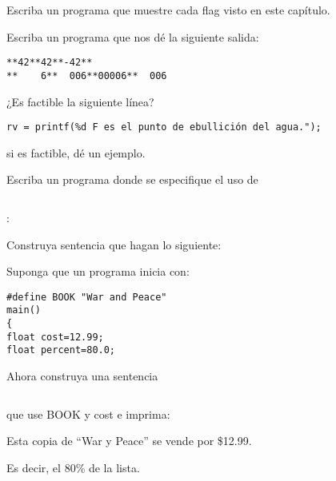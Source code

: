 \documentclass[spanish,addpoints,answers,a4paper]{exam}
\begin{document}
\begin{questions}

\question Escriba un programa que muestre cada flag visto en este capítulo.

\question Escriba un programa que nos dé la siguiente salida:

\begin{verbatim}
**42**42**-42**
**    6**  006**00006**  006
\end{verbatim}

\question ¿Es factible la siguiente línea?

\begin{verbatim}
rv = printf(%d F es el punto de ebullición del agua.");
\end{verbatim}

si es factible, dé un ejemplo.

\question Escriba un programa donde se especifique el uso de \inputminted{bash}{*}:

\question Construya sentencia que hagan lo siguiente:

\question Suponga que un programa inicia con:

\begin{verbatim}
#define BOOK "War and Peace"
main()
{
float cost=12.99;
float percent=80.0;
\end{verbatim}

Ahora construya una sentencia \inputminted{c}{printf()} que use BOOK y cost e imprima:

\begin{flushleft}
Esta copia de ``War y Peace'' se vende por \$12.99.

Es decir, el 80\% de la lista.
\end{flushleft}


\end{questions}
\end{document}
